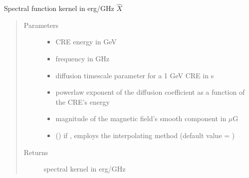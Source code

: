 \documentclass[letterpaper,10pt,english]{sphinxmanual}
\begin{document}
\begin{fulllineitems}
\label{\detokenize{diffsph.spectra:diffsph.spectra.synchrotron.htX}}
\sphinxAtStartPar
Spectral function kernel in erg/GHz \(\hat X\)
\begin{quote}\begin{description}
\item[{Parameters}] \leavevmode\begin{itemize}
\item {} 
\sphinxAtStartPar
{} \textendash{} CRE energy in GeV

\item {} 
\sphinxAtStartPar
{} \textendash{} frequency in GHz

\item {} 
\sphinxAtStartPar
{} \textendash{} diffusion time\sphinxhyphen{}scale parameter for a 1 GeV CRE in s

\item {} 
\sphinxAtStartPar
{} \textendash{} power\sphinxhyphen{}law exponent of the diffusion coefficient as a function of the CRE’s energy

\item {} 
\sphinxAtStartPar
{} \textendash{} magnitude of the magnetic field’s smooth component in \(\mu\)G

\item {} 
\sphinxAtStartPar
{} () \textendash{} if , employs the interpolating method (default value = )

\end{itemize}

\item[{Returns}] \leavevmode
\sphinxAtStartPar
spectral kernel in erg/GHz

\end{description}\end{quote}

\end{fulllineitems}
\end{document}
